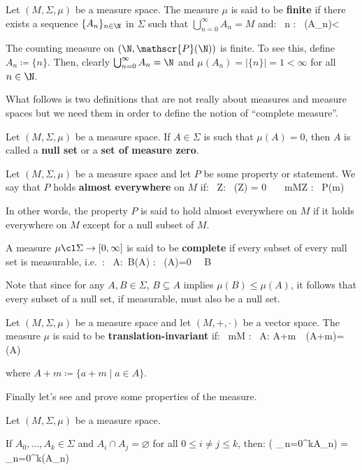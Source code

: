 Let $(M,\Sigma,\mu)$ be a measure space. The measure $\mu$ is said to be \textbf{finite} if there exists a sequence
$\{A_n\}_{n\in\N}$ in $\Sigma$ such that $\bigcup_{n=0}^{\infty}A_n=M$ and:
\bse
\forall \, n \in \N : \ \mu(A_n)<\infty
\ese
\ed

\be
The counting measure on $(\N,\mathscr{P}(\N))$ is finite. To see this, define $A_n \coloneqq \{n\}$. Then, clearly
$\bigcup_{n=0}^{\infty}A_n=\N$ and $\mu(A_n)=|\{n\}|=1<\infty$ for all $n\in \N$.
\ee

What follows is two definitions that are not really about measures and measure spaces but we need them in order to
define the notion of ``complete measure''.

Let $(M,\Sigma,\mu)$ be a measure space. If $A\in\Sigma$ is such that $\mu (A)=0$, then $A$ is called a \textbf{null
set} or a \textbf{set of measure zero}.
\ed

Let $(M,\Sigma,\mu)$ be a measure space and let $P$ be some property or statement. We say that $P$ holds
\textbf{almost everywhere} on $M$ if:
\bse
\exists \, Z\in \Sigma : \ \mu(Z) = 0 \,  \, \forall \, m\in M\setminus Z : \, P(m)
\ese
\ed

In other words, the property $P$ is said to hold almost everywhere on $M$ if it holds everywhere on $M$ except for a
null subset of $M$.

A measure $\mu\cl \Sigma\to [0,\infty]$ is said to be \textbf{complete} if every subset of every null set is
measurable, i.e.\ :
\bse
\forall \, A\in \Sigma :\forall \, B\in{}(A) : \ \mu(A)=0 \, \Rightarrow \, B\in\Sigma
\ese
\ed

Note that since for any $A,B\in\Sigma$, $B\subseteq A$ implies $\mu(B) \leq\mu(A)$, it follows that every subset of a
null set, if measurable, must also be a null set.

Let $(M,\Sigma,\mu)$ be a measure space and let $(M,+,\cdot)$ be a vector space. The measure $\mu$ is said to be
\textbf{translation-invariant} if:
\bse
\forall \, m\in M : \forall \, A\in \Sigma : \quad A+m\in\Sigma\ \ \mu(A+m)=\mu(A)
\ese

where $A+m \coloneqq \{a+m\mid a\in A\}$.
\ed

Finally let's see and prove some properties of the measure.

\bt[]
Let $(M,\Sigma,\mu)$ be a measure space.
\ben[label=(\roman*)]
\item If $A_0,\ldots,A_k \in \Sigma$ and $A_i \cap A_j = \varnothing$ for all $0\leq i\neq j\leq k$, then:
\bse
\mu \biggl( \bigcup_{\,n=0}^{k}A_n\biggr) = \sum_{n=0}^{k}\mu(A_n)
\ese

